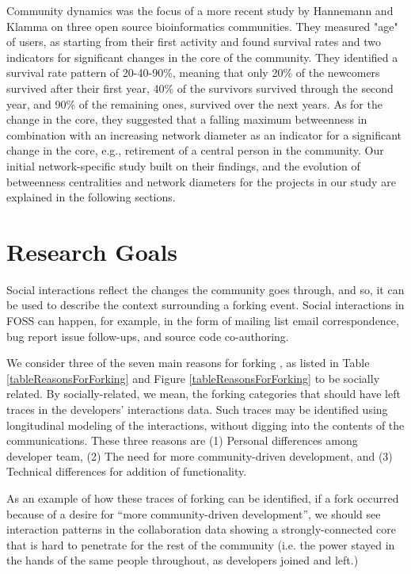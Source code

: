 \documentclass[11pt]{report}
\begin{document}
Community dynamics was the focus of a more recent study by Hannemann and Klamma \cite{Hannemann} on three open source bioinformatics communities. They measured "age" of users, as starting from their first activity and found survival rates and two indicators for significant changes in the core of the community. They identified a survival rate pattern of 20-40-90\%, meaning that only 20\% of the newcomers survived after their first year, 40\% of the survivors survived through the second year, and 90\% of the remaining ones, survived over the next years. As for the change in the core, they suggested that a falling maximum betweenness in combination with an increasing network diameter as an indicator for a significant change in the core, e.g., retirement of a central person in the community. Our initial network-specific study built on their findings, and the evolution of betweenness centralities and network diameters for the projects in our study are explained in the following sections.
\pagebreak

\section{Research Goals}
\label{ResearchGoals}
\label{ResearchObjective}

Social interactions reflect the changes the community goes through, and so, it can be used to describe the context surrounding a forking event. Social interactions in FOSS can happen, for example, in the form of mailing list email correspondence, bug report issue follow-ups, and source code co-authoring. 

We consider three of the seven main reasons for forking \cite{Robles}, as listed in Table \ref{tableReasonsForForking} and Figure \ref{tableReasonsForForking} to be socially related. By socially-related, we mean, the forking categories that should have left traces in the developers' interactions data. Such traces may be identified using longitudinal modeling of the interactions, without digging into the contents of the communications. These three reasons are (1) Personal differences among developer team, (2) The need for more community-driven development, and (3) Technical differences for addition of functionality. 


As an example of how these traces of forking can be identified, if a fork occurred because of a desire for ``more community-driven development'', we should see interaction patterns in the collaboration data showing a strongly-connected core that is hard to penetrate for the rest of the community (i.e. the power stayed in the hands of the same people throughout, as developers joined and left.) \\
\end{document}
